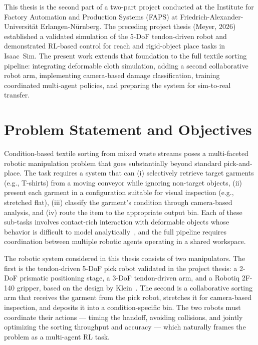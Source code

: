 This thesis is the second part of a two-part project conducted at the Institute for Factory Automation and Production Systems (FAPS) at Friedrich-Alexander-Universität Erlangen-Nürnberg. The preceding project thesis (Meyer, 2026) established a validated simulation of the 5-\ac{DoF} tendon-driven robot and demonstrated \ac{RL}-based control for reach and rigid-object place tasks in Isaac~Sim.
The present work extends that foundation to the full textile sorting pipeline: integrating deformable cloth simulation, adding a second collaborative robot arm, implementing camera-based damage classification, training coordinated multi-agent policies, and preparing the system for sim-to-real transfer.

\section{Problem Statement and Objectives}

Condition-based textile sorting from mixed waste streams poses a multi-faceted robotic manipulation problem that goes substantially beyond standard pick-and-place. The task requires a system that can (i) selectively retrieve target garments (e.g., T-shirts) from a moving conveyor while ignoring non-target objects, (ii) present each garment in a configuration suitable for visual inspection (e.g., stretched flat), (iii) classify the garment's condition through camera-based analysis, and (iv) route the item to the appropriate output bin. Each of these sub-tasks involves contact-rich interaction with deformable objects whose behavior is difficult to model analytically~\cite{Longhini2025ReviewClothManipulation}, and the full pipeline requires coordination between multiple robotic agents operating in a shared workspace.

The robotic system considered in this thesis consists of two manipulators. The first is the tendon-driven 5-\ac{DoF} pick robot validated in the project thesis: a 2-\ac{DoF} prismatic positioning stage, a 3-\ac{DoF} tendon-driven arm, and a Robotiq 2F-140 gripper, based on the design by Klein~\cite{Klein2023}. The second is a collaborative sorting arm that receives the garment from the pick robot, stretches it for camera-based inspection, and deposits it into a condition-specific bin. The two robots must coordinate their actions --- timing the handoff, avoiding collisions, and jointly optimizing the sorting throughput and accuracy --- which naturally frames the problem as a multi-agent \ac{RL} task.

